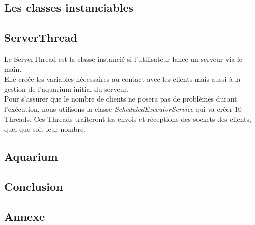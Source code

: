 \documentclass[a4paper, 12pt]{report}
\begin{document}
\begin{spacing}{1.3}
	\textcolor{colortitre2}{\subsection*{Les classes instanciables}}  	

		\textcolor{colortitre3}{\subsection*{ServerThread}}    

	Le ServerThread est la classe instancié si l'utilisateur lance un serveur via le main. \\
	Elle créée les variables nécessaires au contact avec les clients mais aussi à la gestion de l'aquarium initial du serveur. \\
	Pour s'assurer que le nombre de clients ne posera pas de problèmes durant l'exécution, nous utilisons la classe \textit{ScheduledExecutorService} qui va créer 10 Threads. Ces Threads traiteront les envois et réceptions des sockets des clients, quel que soit leur nombre. 

		\textcolor{colortitre3}{\subsection*{}}    
		
		\textcolor{colortitre3}{\subsection*{Aquarium}}    
\textcolor{colortitre1}{\section*{}} 

	\textcolor{colortitre2}{\subsection*{}}    


\textcolor{colortitre1}{\section*{}} 

\textcolor{colortitre1}{\section*{Conclusion}} 

\newpage
\textcolor{colortitre1}{\section*{Annexe}}   

	
	
	
	\end{spacing}
\end{document}
